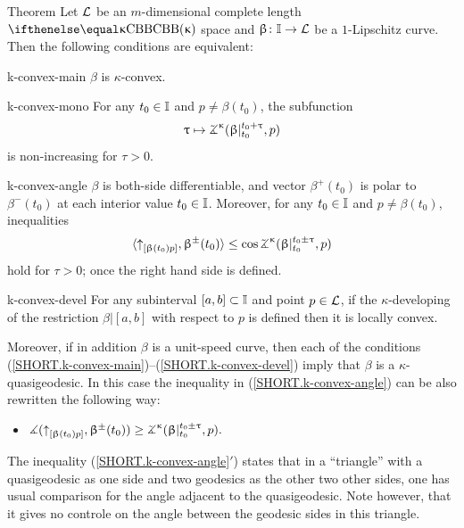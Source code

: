 \begin{thm}{Theorem}\label{thm:defs.of.k-convex.curve}
Let $\mathcal{L}$  be an $m$-dimensional complete length $\Alex{\kappa}$ space
and
$\beta\:\II\to \spc{L}$ be a $1$-Lipschitz curve.
Then the following conditions are equivalent:

\begin{subthm}{k-convex-main} $\beta$ is $\kappa$-convex. 
\end{subthm}


\begin{subthm}{k-convex-mono} For any $t_0\in\II$ and $p\not=\beta(t_0)$, 
the subfunction
\[\tau \mapsto\tangle\mc\kappa(\beta|_{t_0}^{t_0+\tau},p)\]
is non-increasing for $\tau>0$.
\end{subthm}

\begin{subthm}{k-convex-angle} $\beta$ is both-side differentiable, and vector $\beta^+(t_0)$ is polar to $\beta^-(t_0)$ at each interior value $t_0\in \II$.
Moreover, for any $t_0\in\II$ and $p\not=\beta(t_0)$, inequalities
\[\<\dir{\beta(t_0)}p,\beta^\pm(t_0)\>
\le 
\cos\tangle\mc\kappa(\beta|_{t_0}^{t_0\pm\tau}, p)\] 
hold for $\tau>0$; once the right hand side is defined.
\end{subthm}

\begin{subthm}{k-convex-devel} For any subinterval $[a,b]\subset\II$ and point $p\in \spc{L}$,
if the $\kappa$-developing of the restriction $\beta|[a,b]$
with respect to $p$ is defined then it is locally convex.
\end{subthm}

Moreover, if in addition $\beta$ is a unit-speed curve, then each of the conditions  (\ref{SHORT.k-convex-main})--(\ref{SHORT.k-convex-devel}) imply that $\beta$ is a $\kappa$-quasigeodesic.
In this case the inequality in (\ref{SHORT.k-convex-angle}) can be also rewritten the following way:
\begin{itemize}
 \item[\textit{\ref{SHORT.k-convex-angle}$'$)}] $\mangle(\dir{\beta(t_0)}p,\beta^\pm(t_0))
\ge \tangle\mc\kappa(\beta|_{t_0}^{t_0\pm\tau}, p).$
\end{itemize}



\end{thm}

The inequality (\ref{SHORT.k-convex-angle}$'$) states that in a ``triangle'' with a quasigeodesic as one side and two geodesics as the other two other sides, one has usual comparison for the angle adjacent to the quasigeodesic.
Note however, that it gives no controle on the angle between the geodesic sides in this triangle.

